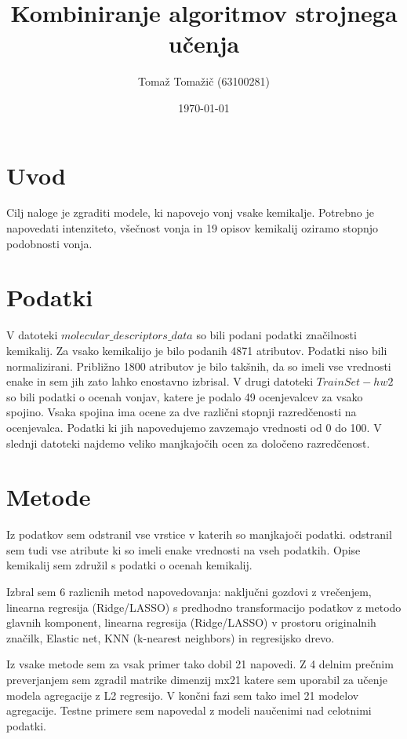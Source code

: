 \documentclass[a4paper,11pt]{article}
\title{Kombiniranje algoritmov strojnega učenja}
\author{Tomaž Tomažič (63100281)}
\date{\today}
\begin{document}
\maketitle

\section{Uvod}

Cilj naloge je zgraditi modele, ki napovejo vonj vsake kemikalje. Potrebno je napovedati intenziteto, všečnost vonja in 19 opisov kemikalij oziramo stopnjo podobnosti vonja.

\section{Podatki}

V datoteki $molecular\_descriptors\_data$ so bili podani podatki značilnosti kemikalij. Za vsako kemikalijo je bilo podanih 4871 atributov. Podatki niso bili normalizirani. Približno 1800 atributov je bilo takšnih, da so imeli vse vrednosti enake in sem jih zato lahko enostavno izbrisal. V drugi datoteki $TrainSet-hw2$ so bili podatki o ocenah vonjav, katere je podalo 49 ocenjevalcev za vsako spojino. Vsaka spojina ima ocene za dve različni stopnji razredčenosti na ocenjevalca. Podatki ki jih napovedujemo zavzemajo vrednosti od 0 do 100. V slednji datoteki najdemo veliko manjkajočih ocen za določeno razredčenost.

\section{Metode}
Iz podatkov sem odstranil vse vrstice v katerih so manjkajoči podatki. odstranil sem tudi vse atribute ki so imeli enake vrednosti na vseh podatkih.
Opise kemikalij sem združil s podatki o ocenah kemikalij.

Izbral sem 6 razlicnih metod napovedovanja: naključni gozdovi z vrečenjem, linearna regresija (Ridge/LASSO) s predhodno transformacijo podatkov z metodo glavnih komponent, linearna regresija (Ridge/LASSO) v prostoru originalnih značilk, Elastic net, KNN (k-nearest neighbors) in regresijsko drevo.

Iz vsake metode sem za vsak primer tako dobil 21 napovedi. Z 4 delnim prečnim preverjanjem sem zgradil matrike dimenzij mx21 katere sem uporabil za učenje modela agregacije z L2 regresijo. V končni fazi sem tako imel 21 modelov agregacije.
Testne primere sem napovedal z modeli naučenimi nad celotnimi podatki.
\end{document}
